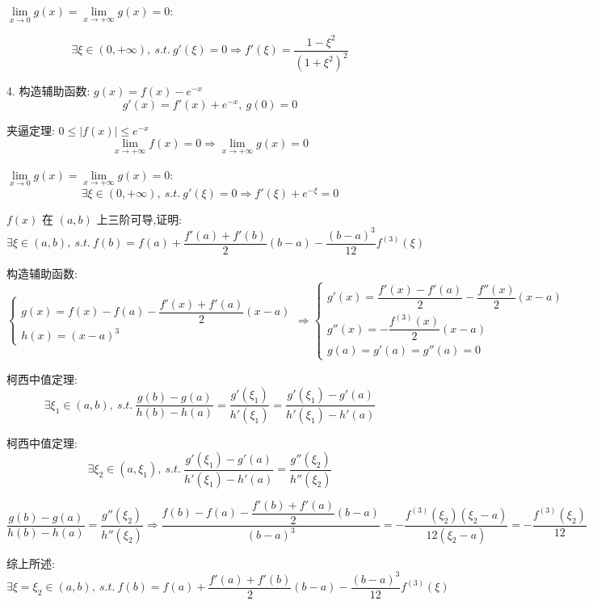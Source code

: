 \begin{solution}
	$\lim\limits_{x\to 0 }g(x)=\lim\limits_{x\to  +\infty}g(x)=0$:

	$$\exists\xi\in(0,+\infty),\ s.t.\ g'(\xi)=0\Rightarrow f'(\xi)=\dfrac{1-\xi^2}{(1+\xi^2)^2}$$


	4. 构造辅助函数: $g(x)=f(x)-e^{-x}$
	$$g'(x)=f'(x)+e^{-x},\ g(0)=0$$

	夹逼定理: $0\leq |f(x)|\leq e^{-x}$
	$$\lim\limits_{x\to +\infty}f(x)=0\Rightarrow \lim\limits_{x\to +\infty}g(x)=0$$

	$\lim\limits_{x\to 0 }g(x)=\lim\limits_{x\to  +\infty}g(x)=0$:
	$$\exists\xi\in(0,+\infty),\ s.t.\ g'(\xi)=0\Rightarrow f'(\xi)+e^{-\xi}=0$$
\end{solution}

\begin{proposition}
	$f(x)$ 在 $(a,b)$ 上三阶可导,证明: 
	$$\exists\xi\in(a,b),\ s.t.\ f(b)=f(a)+\dfrac{f'(a)+f'(b)}{2}(b-a)-\frac{(b-a)^3}{12}f^{(3)}(\xi)$$
\end{proposition}
\begin{solution}

	构造辅助函数:
	$$\begin{cases}
		g(x) = f(x)-f(a)-\dfrac{f'(x)+f'(a)}{2}(x-a)\\
		h(x) = (x-a)^{3} 
	\end{cases}\Rightarrow
	\begin{cases}
		g'(x) = \dfrac{f'(x)-f'(a)}{2} - \dfrac{f''(x)}{2}(x-a)\\
		g''(x) = -\dfrac{f^{(3)}(x)}{2}(x-a)\\
		g(a) = g'(a) = g''(a) = 0 
	\end{cases}$$

	柯西中值定理:
	$$\exists \xi_{1}\in (a,b),\ s.t.\ \dfrac{g(b)-g(a)}{h(b)-h(a)} = \dfrac{g'(\xi_{1})}{h'(\xi_{1})} = \dfrac{g'(\xi_{1})-g'(a)}{h'(\xi_{1})-h'(a)}$$

	柯西中值定理:
	$$\exists \xi_{2}\in (a,\xi_{1}),\ s.t.\ \dfrac{g'(\xi_{1})-g'(a)}{h'(\xi_{1})-h'(a)} = \dfrac{g''(\xi_{2})}{h''(\xi_{2})} $$

	$$\dfrac{g(b)-g(a)}{h(b)-h(a)} = \dfrac{g''(\xi_{2})}{h''(\xi_{2})}\Rightarrow \dfrac{f(b)-f(a)-\dfrac{f'(b)+f'(a)}{2}(b-a)}{(b-a)^{3}} = -\dfrac{f^{(3)}(\xi_{2})(\xi_{2}-a)}{12(\xi_{2}-a)} = -\dfrac{f^{(3)}(\xi_{2})}{12}$$

	综上所述: $\exists \xi = \xi_{2}\in(a,b),\ s.t.\ f(b)=f(a)+\dfrac{f'(a)+f'(b)}{2}(b-a)-\dfrac{(b-a)^3}{12}f^{(3)}(\xi)$

\end{solution}

